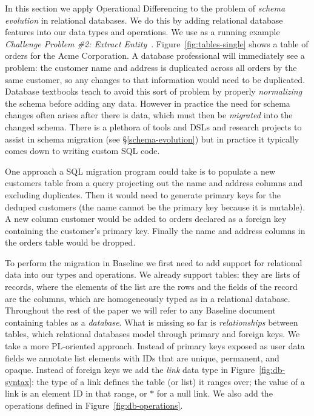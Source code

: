 \documentclass[english,submission]{programming}
\theoremstyle{definition}
\begin{document}
In this section we apply Operational Differencing to the problem of \textit{schema evolution} in relational databases. We do this by adding relational database features into our data types and operations.
We use as a running example \textit{Challenge Problem \#2: Extract Entity}~\cite{challenge-problems}. Figure~\ref{fig:tables-single} shows a table of orders for the Acme Corporation. A database professional will immediately see a problem: the customer name and address is duplicated across all orders by the same customer, so any changes to that information would need to be duplicated.
Database textbooks teach to avoid this sort of problem by properly \textit{normalizing} the schema before adding any data. However in practice the need for schema changes often arises after there is data, which must then be \textit{migrated} into the changed schema. There is a plethora of tools and DSLs and research projects to assist in schema migration (see \S\ref{schema-evolution}) but in practice it typically comes down to writing custom SQL code.

One approach a SQL migration program could take is to populate a new \textsf{customers} table from a query projecting out the \textsf{name} and \textsf{address} columns and excluding duplicates. Then it would need to generate primary keys for the deduped customers (the name cannot be the primary key because it is mutable). A new column \textsf{customer} would be added to \textsf{orders} declared as a foreign key containing the customer's primary key. Finally the \textsf{name} and \textsf{address} columns in the \textsf{orders} table would be dropped.

To perform the migration in Baseline we first need to add support for relational data into our types and operations.
We already support tables: they are lists of records, where the elements of the list are the rows and the fields of the record are the columns, which are homogeneously typed as in a relational database.
Throughout the rest of the paper we will refer to any Baseline document containing tables as a \textit{database}.
What is missing so far is \textit{relationships} between tables, which relational databases model through primary and foreign keys. We take a more PL-oriented approach.
Instead of primary keys exposed as user data fields we annotate list elements with IDs that are unique, permanent, and opaque. Instead of foreign keys we add the \textit{link} data type in Figure~\ref{fig:db-syntax}: the type of a link defines the table (or list) it ranges over; the value of a link is an element ID in that range, or $*$ for a null link. We also add the operations defined in Figure~\ref{fig:db-operations}.
\end{document}
